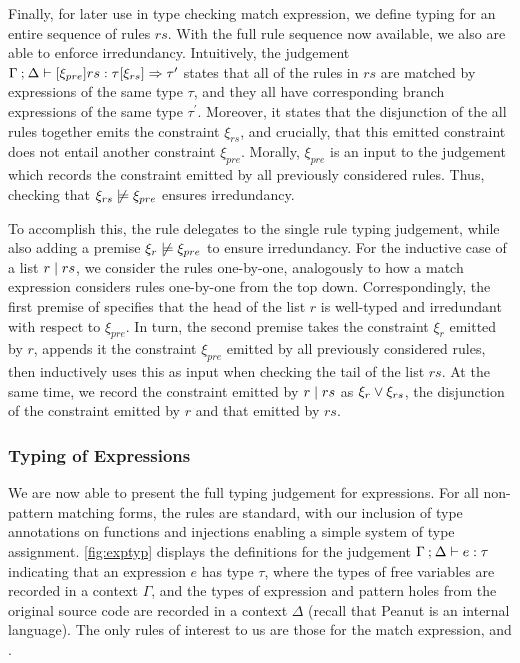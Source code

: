  Finally, for later use in type checking match expression, we define typing for an entire sequence of rules $rs$. With the full rule sequence now available, we also are able to enforce irredundancy. Intuitively, the judgement $\Gamma \mathbin{;} \Delta \vdash [\xi_{pre}] rs : \tau [\xi_{rs}] \Rightarrow \tau'$ states that all of the rules in $rs$ are matched by expressions of the same type $\tau$, and they all have corresponding branch expressions of the same type $\tau^\prime$. Moreover, it states that the disjunction of the all rules together emits the constraint $\xi_{rs}$, and crucially, that this emitted constraint does not entail another constraint $\xi_{pre}$. Morally, $\xi_{pre}$ is an input to the judgement which records the constraint emitted by all previously considered rules. Thus, checking that $\cnotsatisfy{\xi_{rs}}{\xi_{pre}}$ ensures irredundancy.
 
To accomplish this, the rule \TOneRules delegates to the single rule typing judgement, while also adding a premise $\cnotsatisfy{\xi_{r}}{\xi_{pre}}$ to ensure irredundancy. For the inductive case of a list $r \mid rs$, we consider the rules one-by-one, analogously to how a match expression considers rules one-by-one from the top down. Correspondingly, the first premise of \TRules specifies that the head of the list $r$ is well-typed and irredundant with respect to $\xi_{pre}$. In turn, the second premise takes the constraint $\xi_r$ emitted by $r$, appends it the constraint $\xi_{pre}$ emitted by all previously considered rules, then inductively uses this as input when checking the tail of the list $rs$. At the same time, we record the constraint emitted by $r \mid rs$ as $\xi_r \vee \xi_{rs}$, the disjunction of the constraint emitted by $r$ and that emitted by $rs$.



\subsubsection{Typing of Expressions}
 We are now able to present the full typing judgement for expressions. For all non-pattern matching forms, the rules are standard, with our inclusion of type annotations on functions and injections enabling a simple system of type assignment. \autoref{fig:exptyp} displays the definitions for the judgement $\Gamma \mathbin{;} \Delta \vdash e : \tau$ indicating that an expression $e$ has type $\tau$, where the types of free variables are recorded in a context $\Gamma$, and the types of expression and pattern holes from the original source code are recorded in a context $\Delta$ (recall that Peanut is an internal language). The only rules of interest to us are those for the match expression, \TMatchZPre and \TMatchNZPre.
 
